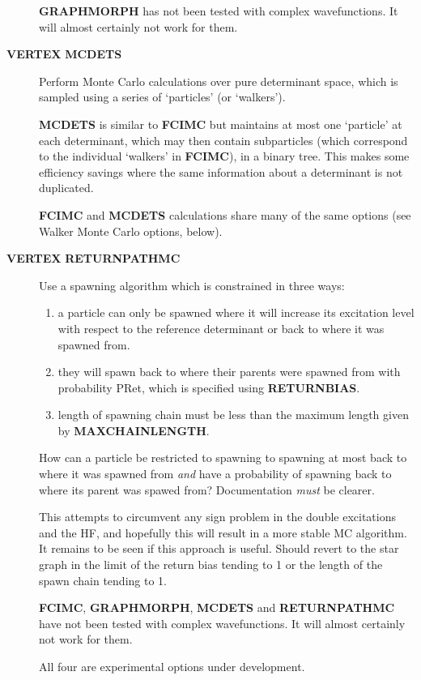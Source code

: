 \documentclass[openany,a4paper,10pt]{manual}
\begin{document}
\begin{description}
\begin{notice}[note]
\textbf{GRAPHMORPH} has not been tested with complex wavefunctions.  It will
almost certainly not work for them.
\end{notice}

\item[\textbf{VERTEX} \textbf{MCDETS}]
Perform Monte Carlo calculations over pure determinant space, which
is sampled using a series of `particles' (or `walkers').

\textbf{MCDETS} is similar to \textbf{FCIMC} but maintains at most one
`particle' at each determinant, which may then contain subparticles
(which correspond to the individual `walkers' in \textbf{FCIMC}), in
a binary tree.  This makes some efficiency savings where the same
information about a determinant is not duplicated.

\textbf{FCIMC} and \textbf{MCDETS} calculations share many of the same options
(see Walker Monte Carlo options, below).

\item[\textbf{VERTEX} \textbf{RETURNPATHMC}]
Use a spawning algorithm which is constrained in three ways:
\begin{enumerate}
\item {} 
a particle can only be spawned where it will increase its
excitation level with respect to the reference determinant or
back to where it was spawned from.

\item {} 
they will spawn back to where their parents were spawned from
with probability PRet, which is specified using \textbf{RETURNBIAS}.

\item {} 
length of spawning chain must be less than the maximum length
given by \textbf{MAXCHAINLENGTH}.

\end{enumerate}

\begin{notice}[note]
How can a particle be restricted to spawning to spawning at most
back to where it was spawned from \emph{and} have a probability of
spawning back to where its parent was spawed from?
Documentation \emph{must} be clearer.
\end{notice}

This attempts to circumvent any sign problem in the double
excitations and the HF, and hopefully this will result in a more stable
MC algorithm. It remains to be seen if this approach is useful.  Should
revert to the star graph in the limit of the return bias tending to 1 or
the length of the spawn chain tending to 1.

\begin{notice}[note]
\textbf{FCIMC}, \textbf{GRAPHMORPH}, \textbf{MCDETS} and \textbf{RETURNPATHMC} have not
been tested with complex wavefunctions.  It will almost certainly
not work for them.

All four are experimental options under development.
\end{notice}

\end{description}
\end{document}
